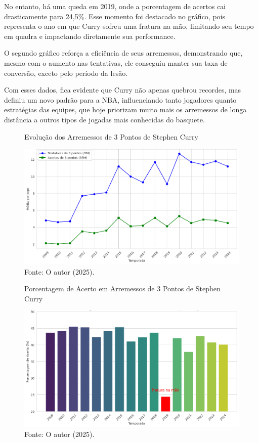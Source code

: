 No entanto, há uma queda em 2019, onde a porcentagem de acertos cai drasticamente para 24,5\%. Esse
momento foi destacado no gráfico, pois representa o ano em que Curry sofreu uma fratura na mão, limitando
seu tempo em quadra e impactando diretamente sua performance.

O segundo gráfico reforça a eficiência de seus arremessos, demonstrando que, mesmo com o aumento nas
tentativas, ele conseguiu manter sua taxa de conversão, exceto pelo período da lesão.

Com esses dados, fica evidente que Curry não apenas quebrou recordes, mas definiu um novo padrão para a
NBA, influenciando tanto jogadores quanto estratégias das equipes, que hoje priorizam muito mais os
arremessos de longa distância a outros tipos de jogadas mais conhecidas do basquete.


\begin{figure}[H]
\centering
\caption{Evolução dos Arremessos de 3 Pontos de Stephen Curry}
\includegraphics[width=\linewidth]{apendices/fig/14_IAA007_1.png}
\caption*{Fonte: O autor (2025).}
\end{figure}

\begin{figure}[H]
\centering
\caption{Porcentagem de Acerto em Arremessos de 3 Pontos de Stephen Curry}
\includegraphics[width=\linewidth]{apendices/fig/14_IAA007_2.png}
\caption*{Fonte: O autor (2025).}
\end{figure}


